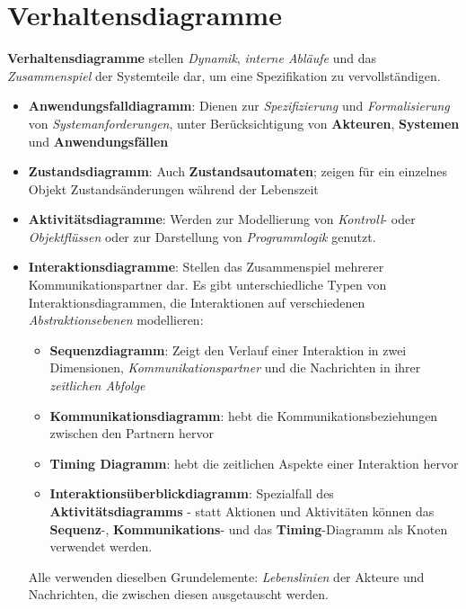 \section{Verhaltensdiagramme}

\begin{tcolorbox}[title=Verhaltensdiagramme]
    \textbf{Verhaltensdiagramme} stellen \textit{Dynamik}, \textit{interne Abläufe} und das \textit{Zusammenspiel} der Systemteile dar, um eine Spezifikation zu vervollständigen.

    \begin{itemize}
        \item \textbf{Anwendungsfalldiagramm}: Dienen zur \textit{Spezifizierung} und \textit{Formalisierung} von \textit{Systemanforderungen}, unter Berücksichtigung von \textbf{Akteuren}, \textbf{Systemen} und \textbf{Anwendungsfällen}
        \item \textbf{Zustandsdiagramm}: Auch \textbf{Zustandsautomaten}; zeigen für ein einzelnes Objekt Zustandsänderungen während der Lebenszeit
        \item \textbf{Aktivitätsdiagramme}: Werden zur Modellierung von \textit{Kontroll}- oder \textit{Objektflüssen} oder zur Darstellung von \textit{Programmlogik} genutzt.
        \item \textbf{Interaktionsdiagramme}: Stellen das Zusammenspiel mehrerer Kommunikationspartner dar.
        Es gibt unterschiedliche Typen von Interaktionsdiagrammen, die Interaktionen auf verschiedenen \textit{Abstraktionsebenen} modellieren:
        \begin{itemize}
            \item \textbf{Sequenzdiagramm}: Zeigt den Verlauf einer Interaktion in zwei Dimensionen, \textit{Kommunikationspartner} und die Nachrichten in ihrer \textit{zeitlichen Abfolge}
            \item \textbf{Kommunikationsdiagramm}: hebt die Kommunikationsbeziehungen zwischen den Partnern hervor
            \item \textbf{Timing Diagramm}: hebt die zeitlichen Aspekte einer Interaktion hervor
            \item \textbf{Interaktionsüberblickdiagramm}: Spezialfall des \textbf{Aktivitätsdiagramms} - statt Aktionen und Aktivitäten können das \textbf{Sequenz}-, \textbf{Kommunikations}- und das \textbf{Timing}-Diagramm als Knoten verwendet werden.
        \end{itemize}
        Alle verwenden dieselben Grundelemente: \textit{Lebenslinien} der Akteure und Nachrichten, die zwischen diesen ausgetauscht werden.
    \end{itemize}
\end{tcolorbox}
